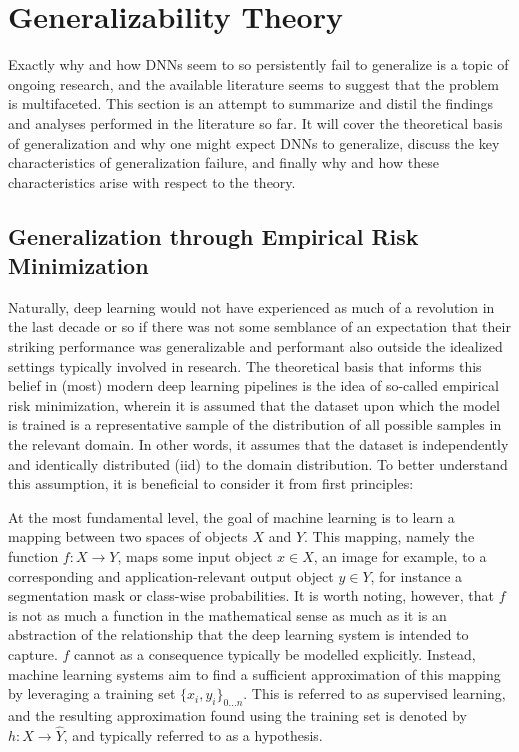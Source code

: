 \section{Generalizability Theory}
	Exactly why and how DNNs seem to so persistently fail to generalize is a topic of ongoing research, and the available literature seems to suggest that the problem is multifaceted. This section is an attempt to summarize and distil the findings and analyses performed in the literature so far. It will cover the theoretical basis of generalization and why one might expect DNNs to generalize, discuss the key characteristics of generalization failure, and finally why and how these characteristics arise with respect to the theory.
	
	\subsection{Generalization through Empirical Risk Minimization} 
		Naturally, deep learning would not have experienced as much of a revolution in the last decade or so if there was not some semblance of an expectation that their striking performance was generalizable and performant also outside the idealized settings typically involved in research. The theoretical basis that informs this belief in (most) modern deep learning pipelines is the idea of so-called empirical risk minimization, wherein it is assumed that the dataset upon which the model is trained is a representative sample of the distribution of all possible samples in the relevant domain. In other words, it assumes that the dataset is independently and identically distributed (iid) to the domain distribution. To better understand this assumption, it is beneficial to consider it from first principles: 
		
		At the most fundamental level, the goal of machine learning is to learn a mapping between two spaces of objects \(X\) and \(Y\). This mapping, namely the function \(f: X \rightarrow Y\), maps some input object \(x \in X\), an image for example, to a corresponding and application-relevant output object \(y \in Y\), for instance a segmentation mask or class-wise probabilities. It is worth noting, however, that \(f\) is not as much a function in the mathematical sense as much as it is an abstraction of the relationship that the deep learning system is intended to capture. \(f\) cannot as a consequence typically be modelled explicitly. Instead, machine learning systems aim to find a sufficient approximation of this mapping by leveraging a training set \(\{x_i, y_i\}_{0...n}\). This is referred to as supervised learning, and the resulting approximation found using the training set is denoted by \(h: X \rightarrow \hat{Y}\), and typically referred to as a hypothesis.  
		        
